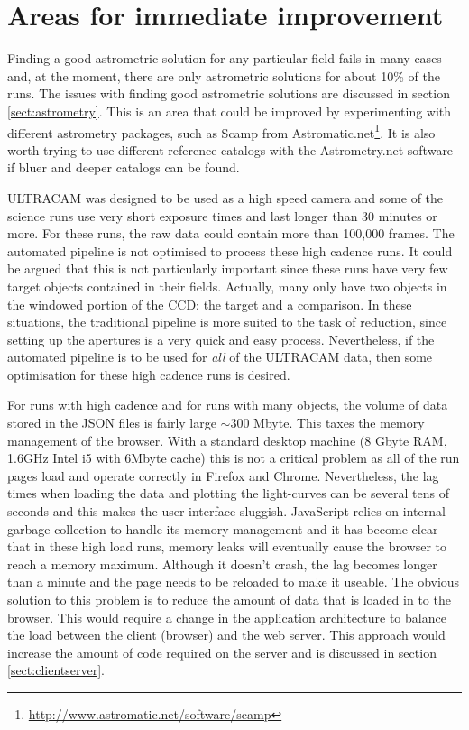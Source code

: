 \section{Areas for immediate improvement}
Finding a good astrometric solution for any particular field fails in many cases and, at the moment, there are only astrometric solutions for about 10\% of the runs. The issues with finding good astrometric solutions are discussed in section \ref{sect:astrometry}. This is an area that could be improved by experimenting with different astrometry packages, such as Scamp from Astromatic.net\footnote{\url{http://www.astromatic.net/software/scamp}}. It is also worth trying to use different reference catalogs with the Astrometry.net software if bluer and deeper catalogs can be found. 

ULTRACAM was designed to be used as a high speed camera and some of the science runs use very short exposure times and last longer than 30 minutes or more. For these runs,  the raw data could contain more than 100,000 frames. The automated pipeline is not optimised to process these high cadence runs. It could be argued that this is not particularly important since these runs have very few target objects contained in their fields. Actually, many only have two objects in the windowed portion of the CCD: the target and a comparison. In these situations, the traditional pipeline is more suited to the task of reduction, since setting up the apertures is a very quick and easy process. Nevertheless, if the automated pipeline is to be used for \emph{all} of the ULTRACAM data, then some optimisation for these high cadence runs is desired. 

For runs with high cadence and for runs with many objects, the volume of data stored in the JSON files is fairly large $\sim 300$ Mbyte. This taxes the memory management of the browser. With a standard desktop machine (8 Gbyte RAM, 1.6GHz Intel i5 with 6Mbyte cache) this is not a critical problem as all of the run pages load and operate correctly in Firefox and Chrome. Nevertheless, the lag times when loading the data and plotting the light-curves can be several tens of seconds and this makes the user interface sluggish. JavaScript relies on internal garbage collection to handle its memory management and it has become clear that in these high load runs, memory leaks will eventually cause the browser to reach a memory maximum. Although it doesn't crash, the lag becomes longer than a minute and the page needs to be reloaded to make it useable. The obvious solution to this problem is to reduce the amount of data that is loaded in to the browser. This would require a change in the application architecture to balance the load between the client (browser) and the web server. This approach would increase the amount of code required on the server and is discussed in section \ref{sect:clientserver}.  

